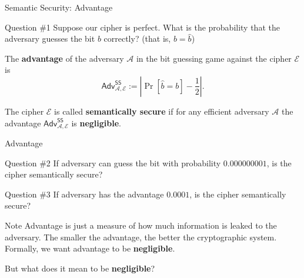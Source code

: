 \documentclass{zkdl-presentation-template}
\begin{document}
    \begin{frame}{Semantic Security: Advantage}
        \begin{questionblock}{Question \#1}
            Suppose our cipher is perfect. What is the probability that the adversary guesses the bit $b$ correctly? (that is, $b = \widehat{b}$)
        \end{questionblock}
        \pause

        \begin{definition}
            The \textbf{advantage} of the adversary $\mathcal{A}$ in the bit guessing game against the cipher $\mathcal{E}$ is
            \begin{equation*}
                \textsf{Adv}^{\textsf{SS}}_{\mathcal{A},\mathcal{E}} := \left| \Pr[\widehat{b} = b] - \frac{1}{2} \right|.
            \end{equation*}
        \end{definition}
        \pause

        \begin{definition}
            The cipher $\mathcal{E}$ is called \textbf{semantically secure} if for any efficient adversary $\mathcal{A}$ the advantage $\textsf{Adv}^{\textsf{SS}}_{\mathcal{A},\mathcal{E}}$ is \textbf{negligible}.
        \end{definition}
    \end{frame}

    \begin{frame}{Advantage}
        \begin{questionblock}{Question \#2}
            If adversary can guess the bit with probability $0.000000001$, is the cipher semantically secure?
        \end{questionblock}
        \pause

        \begin{questionblock}{Question \#3}
            If adversary has the advantage $0.0001$, is the cipher semantically secure?
        \end{questionblock}
        \pause

        \begin{remarkblock}{Note}
            Advantage is just a measure of how much information is leaked to the adversary. The smaller the advantage, the better the cryptographic system. Formally, we want advantage to be \textbf{negligible}.
        \end{remarkblock}

        But what does it mean to be \textbf{negligible}?
    \end{frame}
\end{document}
